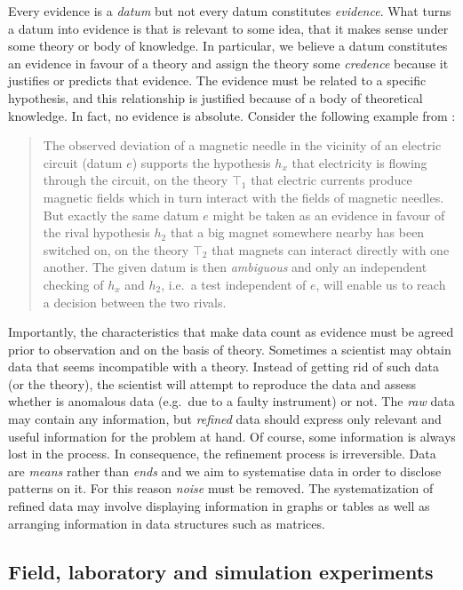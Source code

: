 \documentclass[
]{book}
\begin{document}
Every evidence is a \emph{datum} but not every datum constitutes \emph{evidence}. What turns a datum into evidence is that is relevant to some idea, that it makes sense under some theory or body of knowledge. In particular, we believe a datum constitutes an evidence in favour of a theory and assign the theory some \emph{credence} because it justifies or predicts that evidence. The evidence must be related to a specific hypothesis, and this relationship is justified because of a body of theoretical knowledge. In fact, no evidence is absolute. Consider the following example from \citep{bunge2017philosophy}:

\begin{quote}
The observed deviation of a magnetic needle in the vicinity of an electric circuit (datum \(e\)) supports the hypothesis \(h_x\) that electricity is flowing through the circuit, on the theory \(⊤_1\) that electric currents produce magnetic fields which in turn interact with the fields of magnetic needles. But exactly the same datum \(e\) might be taken as an evidence in favour of the rival hypothesis \(h_2\) that a big magnet somewhere nearby has been switched on, on the theory \(⊤_2\) that magnets can interact directly with one another. The given datum is then \emph{ambiguous} and only an independent checking of \(h_x\) and \(h_2\), i.e.~a test independent of \(e\), will enable us to reach a decision between the two rivals.
\end{quote}

Importantly, the characteristics that make data count as evidence must be agreed prior to observation and on the basis of theory. Sometimes a scientist may obtain data that seems incompatible with a theory. Instead of getting rid of such data (or the theory), the scientist will attempt to reproduce the data and assess whether is anomalous data (e.g.~due to a faulty instrument) or not. The \emph{raw} data may contain any information, but \emph{refined} data should express only relevant and useful information for the problem at hand. Of course, some information is always lost in the process. In consequence, the refinement process is irreversible. Data are \emph{means} rather than \emph{ends} and we aim to systematise data in order to disclose patterns on it. For this reason \emph{noise} must be removed. The systematization of refined data may involve displaying information in graphs or tables as well as arranging information in data structures such as matrices.

\hypertarget{field-laboratory-and-simulation-experiments}{%
\subsection{Field, laboratory and simulation experiments}\label{field-laboratory-and-simulation-experiments}}
\end{document}
